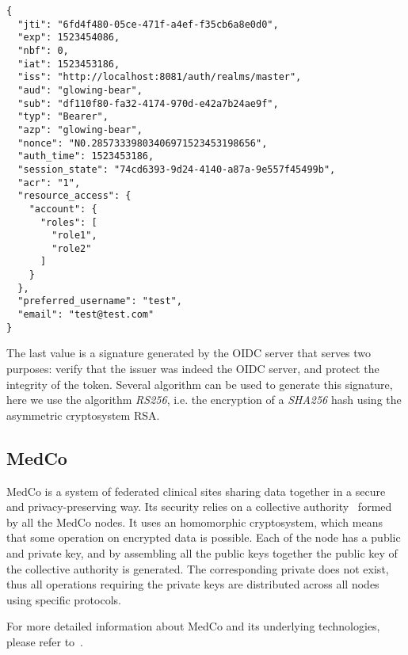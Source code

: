 \begin{verbatim}
{
  "jti": "6fd4f480-05ce-471f-a4ef-f35cb6a8e0d0",
  "exp": 1523454086,
  "nbf": 0,
  "iat": 1523453186,
  "iss": "http://localhost:8081/auth/realms/master",
  "aud": "glowing-bear",
  "sub": "df110f80-fa32-4174-970d-e42a7b24ae9f",
  "typ": "Bearer",
  "azp": "glowing-bear",
  "nonce": "N0.28573339803406971523453198656",
  "auth_time": 1523453186,
  "session_state": "74cd6393-9d24-4140-a87a-9e557f45499b",
  "acr": "1",
  "resource_access": {
    "account": {
      "roles": [
        "role1",
        "role2"
      ]
    }
  },
  "preferred_username": "test",
  "email": "test@test.com"
}
\end{verbatim}

The last value is a signature generated by the OIDC server that serves two purposes: verify that the issuer was indeed the OIDC server, and protect the integrity of the token.
Several algorithm can be used to generate this signature, here we use the algorithm \emph{RS256}, i.e. the encryption of a \emph{SHA256} hash using the asymmetric cryptosystem RSA.


\subsection{MedCo}
\label{sec:bg-medco}

MedCo is a system of federated clinical sites sharing data together in a secure and privacy-preserving way.
Its security relies on a collective authority~\cite{syta2015certificate} formed by all the MedCo nodes.
It uses an homomorphic cryptosystem, which means that some operation on encrypted data is possible. 
Each of the node has a public and private key, and by assembling all the public keys together the public key of the collective authority is generated.
The corresponding private does not exist, thus all operations requiring the private keys are distributed across all nodes using specific protocols.

For more detailed information about MedCo and its underlying technologies, please refer to~\cite{medco}.
